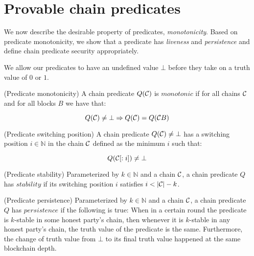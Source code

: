 \section{Provable chain predicates}

We now describe the desirable property of predicates, \textit{monotonicity}. Based
on predicate monotonicity, we show that a predicate has \textit{liveness} and
\textit{persistence} and define chain predicate security appropriately.

We allow our predicates to have an undefined value $\bot$ before they take
on a truth value of $0$ or $1$.

\begin{definition}{(Predicate monotonicity)}
    A chain predicate $Q(\mathcal{C})$ is $\textit{monotonic}$ if for all chains
    $\mathcal{C}$ and for all blocks $B$ we have that:

    \begin{equation*}
        Q(\mathcal{C}) \neq \bot \Rightarrow Q(\mathcal{C}) = Q(\mathcal{C} B)
    \end{equation*}
\end{definition}

\begin{definition}{(Predicate switching position)}
    A chain predicate $Q(\mathcal{C}) \neq \bot$ has a switching position $i \in
    \mathbb{N}$ in the chain $\mathcal{C}$ defined as the minimum $i$ such that:

    \begin{equation*}
        Q(\mathcal{C}[:i]) \neq \bot
    \end{equation*}
\end{definition}

\begin{definition}{(Predicate stability)}
    Parameterized by $k \in \mathbb{N}$ and a chain $\mathcal{C}$, a chain predicate
    $Q$ has $\textit{stability}$ if its switching position $i$ satisfies $i <
    |\mathcal{C}| - k$.
\end{definition}

\begin{definition}{(Predicate persistence)}
    Parameterized by $k \in \mathbb{N}$ and a chain $\mathcal{C}$, a chain predicate
    $Q$ has $\textit{persistence}$ if the following is true: When in a certain
    round the predicate is $k$-stable in some honest party's chain, then
    whenever it is $k$-stable in any honest party's chain, the truth value of
    the predicate is the same. Furthermore, the change of truth value from
    $\bot$ to its final truth value happened at the same blockchain depth.
\end{definition}

